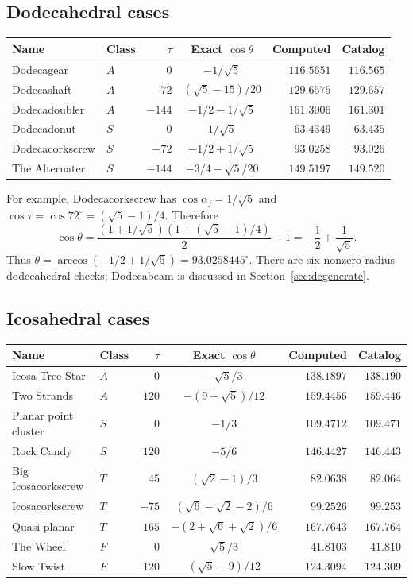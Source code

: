 \documentclass[11pt,letterpaper]{article}
\newcommand{\aj}{\alpha_j}
\newcommand{\degc}{^{\circ}}
\begin{document}
\subsection{Dodecahedral cases}
\begin{center}\small
\setlength{\tabcolsep}{5pt}
\begin{tabular}{llrcrr}
\toprule
Name & Class & $\tau$ & Exact $\cos\theta$ & Computed & Catalog\\
\midrule
Dodecagear & $A$ & $0$ & $-1/\sqrt5$ & $116.5651$ & $116.565$\\
Dodecashaft & $A$ & $-72$ & $(\sqrt5-15)/20$ & $129.6575$ & $129.657$\\
Dodecadoubler & $A$ & $-144$ & $-1/2-1/\sqrt5$ & $161.3006$ & $161.301$\\
Dodecadonut & $S$ & $0$ & $1/\sqrt5$ & $63.4349$ & $63.435$\\
Dodecacorkscrew & $S$ & $-72$ & $-1/2+1/\sqrt5$ & $93.0258$ & $93.026$\\
The Alternater & $S$ & $-144$ & $-3/4-\sqrt5/20$ & $149.5197$ & $149.520$\\
\bottomrule
\end{tabular}
\end{center}

For example, Dodecacorkscrew has $\cos\aj=1/\sqrt5$ and
$\cos\tau=\cos72\degc=(\sqrt5-1)/4$. Therefore
\[
  \cos\theta
  =\frac{(1+1/\sqrt5)(1+(\sqrt5-1)/4)}{2}-1
  =-\frac12+\frac1{\sqrt5}.
\]
Thus $\theta=\arccos(-1/2+1/\sqrt5)=93.0258445\degc$.
There are six nonzero-radius dodecahedral checks; Dodecabeam is discussed
in Section~\ref{sec:degenerate}.

\newpage
\subsection{Icosahedral cases}
\begin{center}\small
\setlength{\tabcolsep}{6pt}
\begin{tabular}{llrcrr}
\toprule
Name & Class & $\tau$ & Exact $\cos\theta$ & Computed & Catalog\\
\midrule
Icosa Tree Star & $A$ & $0$ & $-\sqrt5/3$ & $138.1897$ & $138.190$\\
Two Strands & $A$ & $120$ & $-(9+\sqrt5)/12$ & $159.4456$ & $159.446$\\
Planar point cluster & $S$ & $0$ & $-1/3$ & $109.4712$ & $109.471$\\
Rock Candy & $S$ & $120$ & $-5/6$ & $146.4427$ & $146.443$\\
Big Icosacorkscrew & $T$ & $45$ & $(\sqrt2-1)/3$ & $82.0638$ & $82.064$\\
Icosacorkscrew & $T$ & $-75$ & $(\sqrt6-\sqrt2-2)/6$ & $99.2526$ & $99.253$\\
Quasi-planar & $T$ & $165$ & $-(2+\sqrt6+\sqrt2)/6$ & $167.7643$ & $167.764$\\
The Wheel & $F$ & $0$ & $\sqrt5/3$ & $41.8103$ & $41.810$\\
Slow Twist & $F$ & $120$ & $(\sqrt5-9)/12$ & $124.3094$ & $124.309$\\
\bottomrule
\end{tabular}
\end{center}
\end{document}

